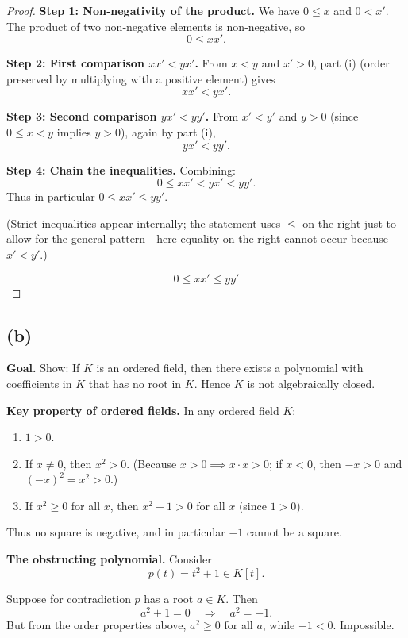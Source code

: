 \documentclass[12pt,a4paper]{article}
\theoremstyle{definition}
\theoremstyle{remark}
\begin{document}
\begin{proof}
\textbf{Step 1: Non‑negativity of the product.}  
We have \(0 \le x\) and \(0 < x'\). The product of two non‑negative elements is non‑negative, so
\[
0 \le x x'.
\]

\textbf{Step 2: First comparison \(x x' < y x'\).}  
From \(x<y\) and \(x'>0\), part (i) (order preserved by multiplying with a positive element) gives
\[
x x' < y x'.
\]

\textbf{Step 3: Second comparison \(y x' < y y'\).}  
From \(x'<y'\) and \(y>0\) (since \(0 \le x < y\) implies \(y>0\)), again by part (i),
\[
y x' < y y'.
\]

\textbf{Step 4: Chain the inequalities.}  
Combining:
\[
0 \le x x' < y x' < y y'.
\]
Thus in particular \(0 \le x x' \le y y'\).

(Strict inequalities appear internally; the statement uses \(\le\) on the right just to allow for the general pattern—here equality on the right cannot occur because \(x'<y'\).)

\[
\boxed{0 \le x x' \le y y'}
\]
\end{proof}

\subsection*{(b)}

\textbf{Goal.} Show: If \(K\) is an ordered field, then there exists a polynomial with coefficients in \(K\) that has no root in \(K\). Hence \(K\) is not algebraically closed.

\textbf{Key property of ordered fields.} In any ordered field \(K\):

\begin{enumerate}
    \item \(1 > 0\).
    \item If \(x \neq 0\), then \(x^2 > 0\). (Because \(x > 0 \implies x \cdot x > 0\); if \(x < 0\), then \(-x > 0\) and \((-x)^2 = x^2 > 0\).)
    \item If \(x^2 \ge 0\) for all \(x\), then \(x^2 + 1 > 0\) for all \(x\) (since \(1 > 0\)).
\end{enumerate}

Thus no square is negative, and in particular \(-1\) cannot be a square.

\textbf{The obstructing polynomial.} Consider
\[
p(t) = t^2 + 1 \in K[t].
\]

Suppose for contradiction \(p\) has a root \(a \in K\). Then
\[
a^2 + 1 = 0 \quad\Longrightarrow\quad a^2 = -1.
\]
But from the order properties above, \(a^2 \ge 0\) for all \(a\), while \(-1 < 0\). Impossible.
\end{document}

